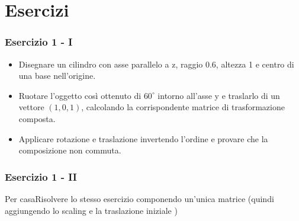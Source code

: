 \documentclass{beamer}
\newcommand{\fig}{figures} %
\begin{document}
\section{Esercizi}
%
\begin{frame}
\frametitle{Esercizio 1 - I}
\begin{itemize}
\item Disegnare un cilindro con asse parallelo a z, raggio 0.6, altezza 1 e centro di una base nell'origine.
\item Ruotare l'oggetto cos\`i ottenuto di $60^\circ$ intorno all'asse y e traslarlo di un vettore 
$( 1,0,1)$, calcolando la corrispondente matrice di trasformazione composta.
\item Applicare rotazione e traslazione invertendo l'ordine e provare che la composizione non commuta.
\end{itemize}
\end{frame}
\begin{frame}
\frametitle{Esercizio 1 - II}
\begin{center}
\end{center}
\begin{block}{Per casa}{Risolvere lo stesso esercizio componendo un'unica matrice (quindi aggiungendo lo scaling e la traslazione iniziale )}
\end{block}
\end{frame}
\end{document}
